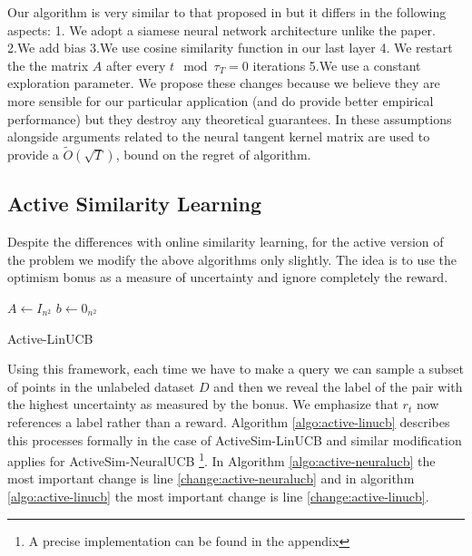 \documentclass{article}
\begin{document}
Our algorithm is very similar to that proposed in \cite{neuralucb} but it differs in the following aspects: 1. We adopt a siamese neural network architecture unlike the paper.
2.We add bias 3.We use cosine similarity function in our last layer 4. We restart the the matrix $A$ after every $t \mod \tau_T = 0$ iterations 5.We use a constant exploration parameter.
We propose these changes because we believe they are more sensible for our particular application (and do provide better empirical performance) but they destroy any theoretical guarantees.
In \cite{neuralucb} these assumptions alongside arguments related to the  neural tangent kernel matrix \cite{neuraltangentkernel} are used to provide a $\tilde{O}(\sqrt{T})$, bound on the regret of algorithm.


  \subsection{Active Similarity Learning}
  Despite the differences with online similarity learning, for the active version of the problem we modify the above algorithms only slightly.
  The idea is to use the optimism bonus as a measure of uncertainty and ignore completely the reward.
\begin{algorithm}
    $A \gets I_{n^2}$\;
    $b \gets 0_{n^2}$\;
    \caption{Active-LinUCB}\label{algo:active-linucb}
\end{algorithm}

Using this framework, each time we have to make a query we can sample a subset of points in the unlabeled dataset $D$  and then we reveal the label of the pair with the highest uncertainty as measured by the bonus.
We emphasize that $r_t$ now references a label rather than a reward.
Algorithm \ref{algo:active-linucb} describes this processes formally in the case of ActiveSim-LinUCB and similar modification applies for ActiveSim-NeuralUCB \footnote{A precise implementation can be found in the appendix}.
In Algorithm \ref{algo:active-neuralucb} the most important change is line \ref{change:active-neuralucb} and in algorithm
\ref{algo:active-linucb} the most important change is line \ref{change:active-linucb}.
\end{document}
